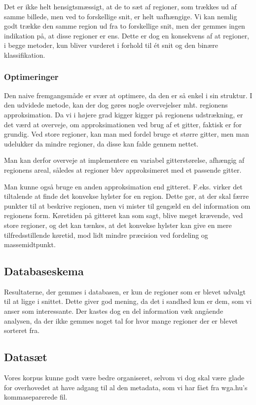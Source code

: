 {Det er ikke helt hensigtsmæssigt, at de to sæt af regioner, som trækkes
ud af samme billede, men ved to forskellige snit, er helt uafhængige. Vi
kan nemlig godt trække den samme region ud fra to forskellige snit, men
der gemmes ingen indikation på, at disse regioner er ens.  Dette er dog
en konsekvens af at regioner, i begge metoder, kun bliver vurderet i
forhold til ét snit og den binære klassifikation.

\subsubsection{Optimeringer}
Den naive fremgangsmåde er svær at optimere, da den er så enkel i sin
struktur. I den udvidede metode, kan der dog gøres nogle overvejelser
mht. regionens approksimation. Da vi i højere grad kigger kigger på
regionens udstrækning, er det værd at overveje, om approksimationen ved
brug af et gitter, faktisk er for grundig. Ved store regioner, kan man
med fordel bruge et større gitter, men man udelukker da mindre regioner,
da disse kan falde gennem nettet.

Man kan derfor overveje at implementere en variabel gitterstørelse,
afhængig af regionens areal, således at regioner blev approksimeret med
et passende gitter.

Man kunne også bruge en anden approksimation end gitteret. F.eks. virker
det tiltalende at finde det konvekse hylster for en region. Dette
gør, at der skal færre punkter til at beskrive regionen, men vi mister
til gengæld en del information om regionens form. Køretiden på gitteret
kan som sagt, blive meget krævende, ved store regioner, og det kan
tænkes, at det konvekse hylster kan give en mere tilfredsstillende
køretid, mod lidt mindre præcision ved fordeling og massemidtpunkt.

\subsection{Databaseskema}
Resultaterne, der gemmes i databasen, er kun de regioner som er blevet
udvalgt til at ligge i snittet. Dette giver god mening, da det i sandhed
kun er dem, som vi anser som interessante. Der kastes dog en del
information væk angående analysen, da der ikke gemmes noget tal for hvor
mange regioner der er blevet sorteret fra.

\subsection{Datasæt}
Vores korpus kunne godt være bedre organiseret, selvom vi dog skal være
glade for overhovedet at have adgang til al den metadata, som vi har
fået fra wga.hu's kommaseparerede fil.

}
